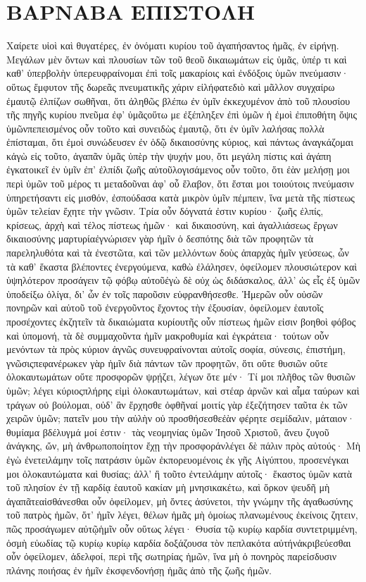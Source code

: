 \section{ΒΑΡΝΑΒΑ ΕΠΙΣΤΟΛΗ}
Χαίρετε υἱοὶ καὶ θυγατέρες, ἐν ὀνόματι κυρίου τοῦ ἀγαπήσαντος ἡμᾶς, ἐν εἰρήνῃ.
Μεγάλων μὲν ὄντων καὶ πλουσίων τῶν τοῦ θεοῦ δικαιωμάτων εἰς ὑμᾶς, ὑπέρ τι καὶ καθ’ ὑπερβολὴν ὑπερευφραίνομαι ἐπὶ τοῖς μακαρίοις καὶ ἐνδόξοις ὑμῶν πνεύμασιν· οὕτως ἔμφυτον τῆς δωρεᾶς πνευματικῆς χάριν εἰλήφατεδιὸ καὶ μᾶλλον συγχαίρω ἐμαυτῷ ἐλπίζων σωθῆναι, ὅτι ἀληθῶς βλέπω ἐν ὑμῖν ἐκκεχυμένον ἀπὸ τοῦ πλουσίου τῆς πηγῆς κυρίου πνεῦμα ἐφ’ ὑμᾶςοὕτω με ἐξέπληξεν ἐπὶ ὑμῶν ἡ ἐμοὶ ἐπιποθήτη ὄψις ὑμῶνπεπεισμένος οὖν τοῦτο καὶ συνειδὼς ἐμαυτῷ, ὅτι ἐν ὑμῖν λαλήσας πολλὰ ἐπίσταμαι, ὅτι ἐμοὶ συνώδευσεν ἐν ὁδῷ δικαιοσύνης κύριος, καὶ πάντως ἀναγκάζομαι κἀγὼ εἰς τοῦτο, ἀγαπᾶν ὑμᾶς ὑπὲρ τὴν ψυχήν μου, ὅτι μεγάλη πίστις καὶ ἀγάπη ἐγκατοικεῖ ἐν ὑμῖν ἐπ’ ἐλπίδι ζωῆς αὐτοῦλογισάμενος οὖν τοῦτο, ὅτι ἐὰν μελήσῃ μοι περὶ ὑμῶν τοῦ μέρος τι μεταδοῦναι ἀφ’ οὗ ἔλαβον, ὅτι ἔσται μοι τοιούτοις πνεύμασιν ὑπηρετήσαντι εἰς μισθόν, ἐσπούδασα κατὰ μικρὸν ὑμῖν πέμπειν, ἵνα μετὰ τῆς πίστεως ὑμῶν τελείαν ἔχητε τὴν γνῶσιν.
Τρία οὖν δόγνατά ἐστιν κυρίου· ζωῆς ἐλπίς, κρίσεως, ἀρχὴ καὶ τέλος πίστεως ἡμῶν· καὶ δικαιοσύνη, καὶ ἀγαλλιάσεως ἔργων δικαιοσύνης μαρτυρίαἐγνώρισεν γὰρ ἡμῖν ὁ δεσπότης διὰ τῶν προφητῶν τὰ παρεληλυθότα καὶ τὰ ἐνεστῶτα, καὶ τῶν μελλόντων δοὺς ἀπαρχὰς ἡμῖν γεύσεως, ὧν τὰ καθ’ ἕκαστα βλέποντες ἐνεργούμενα, καθὼ ἐλάλησεν, ὀφείλομεν πλουσιώτερον καὶ ὑψηλότερον προσάγειν τῷ φόβῳ αὐτοῦἐγὼ δὲ οὐχ ὡς διδάσκαλος, ἀλλ’ ὡς εἷς ἐξ ὑμῶν ὑποδείξω ὀλίγα, δι’ ὧν ἐν τοῖς παροῦσιν εὐφρανθήσεσθε.
Ἡμερῶν οὖν οὐσῶν πονηρῶν καὶ αὐτοῦ τοῦ ἐνεργοῦντος ἔχοντος τὴν ἐξουσίαν, ὀφείλομεν ἑαυτοῖς προσέχοντες ἐκζητεῖν τὰ δικαιώματα κυρίουτῆς οὖν πίστεως ἡμῶν εἰσιν βοηθοὶ φόβος καὶ ὑπομονή, τὰ δὲ συμμαχοῦντα ἡμῖν μακροθυμία καὶ ἐγκράτεια· τούτων οὖν μενόντων τὰ πρὸς κύριον ἁγνῶς συνευφραίνονται αὐτοῖς σοφία, σύνεσις, ἐπιστήμη, γνῶσιςπεφανέρωκεν γὰρ ἡμῖν διὰ πάντων τῶν προφητῶν, ὅτι οὔτε θυσιῶν οὔτε ὁλοκαυτωμάτων οὔτε προσφορῶν ψρῄζει, λέγων ὅτε μέν· Τί μοι πλῆθος τῶν θυσιῶν ὑμῶν; λέγει κύριοςπλήρης εἰμὶ ὁλοκαυτωμάτων, καὶ στέαρ ἀρνῶν καὶ αἷμα ταύρων καὶ τράγων οὐ βούλομαι, οὐδ’ ἂν ἔρχησθε ὀφθῆναί μοιτίς γὰρ ἐξεζήτησεν ταῦτα ἐκ τῶν χειρῶν ὑμῶν; πατεῖν μου τὴν αὐλὴν οὐ προσθήσεσθεἐὰν φέρητε σεμίδαλιν, μάταιον· θυμίαμα βδέλυγμά μοί ἐστιν· τὰς νεομηνίας ὑμῶν Ἰησοῦ Χριστοῦ, ἄνευ ζυγοῦ ἀνάγκης, ὤν, μὴ ἀνθρωποποίητον ἔχῃ τὴν προσφοράνλέγει δὲ πάλιν πρὸς αὐτούς· Μὴ ἐγὼ ἐνετειλάμην τοῖς πατράσιν ὑμῶν ἐκπορευομένοις ἐκ γῆς Αἰγύπτου, προσενέγκαι μοι ὁλοκαυτώματα καὶ θυσίας; ἀλλ’ ἢ τοῦτο ἐντειλάμην αὐτοῖς· ἕκαστος ὑμῶν κατὰ τοῦ πλησίον ἐν τῇ καρδίᾳ ἑαυτοῦ κακίαν μὴ μνησικακέτω, καὶ ὅρκον ψευδῆ μὴ ἀγαπᾶτεαἰσθάνεσθαι οὖν ὀφείλομεν, μὴ ὄντες ἀσύνετοι, τὴν γνώμην τῆς ἀγαθωσύνης τοῦ πατρὸς ἡμῶν, ὅτ’ ἡμῖν λέγει, θέλων ἡμᾶς μὴ ὁμοίως πλανωμένους ἐκείνοις ζητειν, πῶς προσάγωμεν αὐτῷἡμῖν οὖν οὕτως λέγει· Θυσία τῷ κυρίῳ καρδία συντετριμμένη, ὀσμὴ εὐωδίας τῷ κυρίῳ κυρίῳ καρδία δοξάζουσα τὸν πεπλακότα αὐτήνἀκριβεύεσθαι οὖν ὀφείλομεν, ἀδελφοί, περὶ τῆς σωτηρίας ἡμῶν, ἵνα μὴ ὁ πονηρὸς παρείσδυσιν πλάνης ποιήσας ἐν ἡμῖν ἐκσφενδονήσῃ ἡμᾶς ἀπὸ τῆς ζωῆς ἡμῶν.
